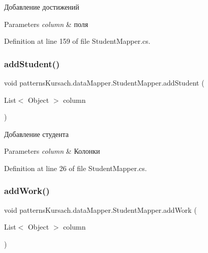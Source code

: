 Добавление достижений 


\begin{DoxyParams}{Parameters}
{\em column} & поля\\
\hline
\end{DoxyParams}


Definition at line 159 of file Student\+Mapper.\+cs.

\mbox{\label{classpatterns_kursach_1_1data_mapper_1_1_student_mapper_adc1a026a6c10fa11740bd6f9a39231b0}} 
\subsubsection{\texorpdfstring{add\+Student()}{addStudent()}}
{\footnotesize\ttfamily void patterns\+Kursach.\+data\+Mapper.\+Student\+Mapper.\+add\+Student (\begin{DoxyParamCaption}\item[{List$<$ Object $>$}]{column }\end{DoxyParamCaption})}



Добавление студента 


\begin{DoxyParams}{Parameters}
{\em column} & Колонки\\
\hline
\end{DoxyParams}


Definition at line 26 of file Student\+Mapper.\+cs.

\mbox{\label{classpatterns_kursach_1_1data_mapper_1_1_student_mapper_ad5ade2f61c321ca510cc9c2b8d008ed4}} 
\subsubsection{\texorpdfstring{add\+Work()}{addWork()}}
{\footnotesize\ttfamily void patterns\+Kursach.\+data\+Mapper.\+Student\+Mapper.\+add\+Work (\begin{DoxyParamCaption}\item[{List$<$ Object $>$}]{column }\end{DoxyParamCaption})}



